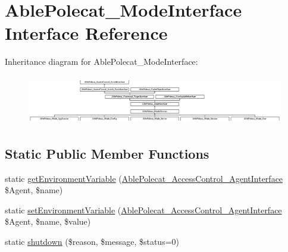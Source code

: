 \hypertarget{interface_able_polecat___mode_interface}{}\section{Able\+Polecat\+\_\+\+Mode\+Interface Interface Reference}
\label{interface_able_polecat___mode_interface}
Inheritance diagram for Able\+Polecat\+\_\+\+Mode\+Interface\+:\begin{figure}[H]
\begin{center}
\leavevmode
\includegraphics[height=2.167742cm]{interface_able_polecat___mode_interface}
\end{center}
\end{figure}
\subsection*{Static Public Member Functions}
\begin{DoxyCompactItemize}
\item 
static \hyperlink{interface_able_polecat___mode_interface_a04e7e0f41da8037ae797868b61b6df77}{get\+Environment\+Variable} (\hyperlink{interface_able_polecat___access_control___agent_interface}{Able\+Polecat\+\_\+\+Access\+Control\+\_\+\+Agent\+Interface} \$Agent, \$name)
\item 
static \hyperlink{interface_able_polecat___mode_interface_a68bdefd00518f09963ea3fa95cd2a242}{set\+Environment\+Variable} (\hyperlink{interface_able_polecat___access_control___agent_interface}{Able\+Polecat\+\_\+\+Access\+Control\+\_\+\+Agent\+Interface} \$Agent, \$name, \$value)
\item 
static \hyperlink{interface_able_polecat___mode_interface_a55c20682b992aa8250b1d03f03f58385}{shutdown} (\$reason, \$message, \$status=0)
\end{DoxyCompactItemize}
